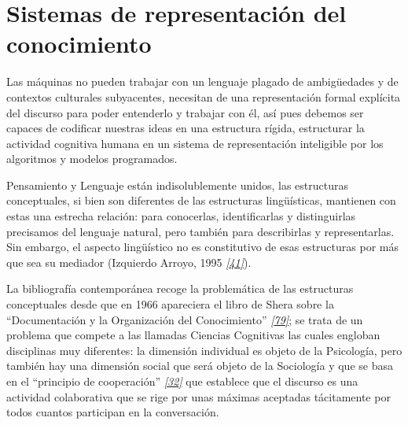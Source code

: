 \documentclass[a4paper,12pt,spanish]{book}
\begin{document}
\section{Sistemas de representación del conocimiento}
\label{1.state-of-the-art/i.representacion-conocimiento::doc}\label{1.state-of-the-art/i.representacion-conocimiento:sistemas-de-representacion-del-conocimiento}
Las máquinas no pueden trabajar con un lenguaje plagado de ambigüedades y de contextos
culturales subyacentes, necesitan de una representación formal explícita del
discurso para poder entenderlo y trabajar con él, así pues debemos ser capaces de
codificar nuestras ideas en una estructura rígida, estructurar la actividad
cognitiva humana en un sistema de representación inteligible por los algoritmos y
modelos programados.

Pensamiento y Lenguaje están indisolublemente unidos, las estructuras conceptuales,
si bien son diferentes de las estructuras lingüísticas, mantienen con estas una
estrecha relación: para conocerlas, identificarlas y distinguirlas precisamos del
lenguaje natural, pero también para describirlas y representarlas. Sin embargo, el
aspecto lingüístico no es constitutivo de esas estructuras por más que sea su
mediador (Izquierdo Arroyo, 1995 \label{1.state-of-the-art/i.representacion-conocimiento:id1}{\hyperref[zreferences:izquierdoarroyo1995]{\emph{{[}41{]}}}}).

La bibliografía contemporánea recoge la problemática de las estructuras conceptuales
desde que en 1966 apareciera el libro de Shera sobre la ``Documentación y la Organización
del Conocimiento'' \label{1.state-of-the-art/i.representacion-conocimiento:id2}{\hyperref[zreferences:shera1966]{\emph{{[}79{]}}}}; se trata de un problema que compete a las llamadas
Ciencias Cognitivas las cuales engloban disciplinas muy diferentes: la dimensión individual es
objeto de la Psicología, pero también hay una dimensión social que será objeto de la Sociología
y que se basa en el ``principio de cooperación'' \label{1.state-of-the-art/i.representacion-conocimiento:id3}{\hyperref[zreferences:grice1975]{\emph{{[}32{]}}}} que establece que el discurso
es una actividad colaborativa que se rige por unas máximas aceptadas tácitamente por todos
cuantos participan en la conversación.
\end{document}
